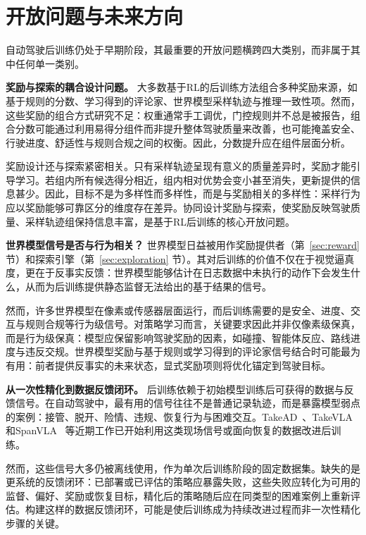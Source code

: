 \documentclass[runningheads]{llncs}
\begin{document}
\section{开放问题与未来方向}
\label{sec:future}

自动驾驶后训练仍处于早期阶段，其最重要的开放问题横跨四大类别，而非属于其中任何单一类别。

\textbf{奖励与探索的耦合设计问题。}
大多数基于RL的后训练方法组合多种奖励来源，如基于规则的分数、学习得到的评论家、世界模型采样轨迹与推理一致性项。然而，这些奖励的组合方式研究不足：权重通常手工调优，门控规则并不总是被报告，组合分数可能通过利用易得分组件而非提升整体驾驶质量来改善，也可能掩盖安全、行驶进度、舒适性与规则合规之间的权衡。因此，分数提升应在组件层面分析。

奖励设计还与探索紧密相关。只有采样轨迹呈现有意义的质量差异时，奖励才能引导学习。若组内所有候选得分相近，组内相对优势会变小甚至消失，更新提供的信息甚少。因此，目标不是为多样性而多样性，而是与奖励相关的多样性：采样行为应以奖励能够可靠区分的维度存在差异。协同设计奖励与探索，使奖励反映驾驶质量、采样轨迹组保持信息丰富，是基于RL后训练的核心开放问题。

\textbf{世界模型信号是否与行为相关？}
世界模型日益被用作奖励提供者（第~\ref{sec:reward} 节）和探索引擎（第~\ref{sec:exploration} 节）。其对后训练的价值不仅在于视觉逼真度，更在于反事实反馈：世界模型能够估计在日志数据中未执行的动作下会发生什么，从而为后训练提供静态监督无法给出的基于结果的信号。

然而，许多世界模型在像素或传感器层面运行，而后训练需要的是安全、进度、交互与规则合规等行为级信号。对策略学习而言，关键要求因此并非仅像素级保真，而是行为级保真：模型应保留影响驾驶奖励的因素，如碰撞、智能体反应、路线进度与违反交规。世界模型奖励与基于规则或学习得到的评论家信号结合时可能最为有用：前者提供反事实的未来状态，显式奖励项则将优化锚定到驾驶目标。


\textbf{从一次性精化到数据反馈闭环。}
后训练依赖于初始模型训练后可获得的数据与反馈信号。在自动驾驶中，最有用的信号往往不是普通记录轨迹，而是暴露模型弱点的案例：接管、脱开、险情、违规、恢复行为与困难交互。TakeAD~\cite{takead2025}、TakeVLA~\cite{takevla2026} 和SpanVLA~\cite{spanvla2026} 等近期工作已开始利用这类现场信号或面向恢复的数据改进后训练。

然而，这些信号大多仍被离线使用，作为单次后训练阶段的固定数据集。缺失的是更系统的反馈闭环：已部署或已评估的策略应暴露失败，这些失败应转化为可用的监督、偏好、奖励或恢复目标，精化后的策略随后应在同类型的困难案例上重新评估。构建这样的数据反馈闭环，可能是使后训练成为持续改进过程而非一次性精化步骤的关键。
\end{document}
